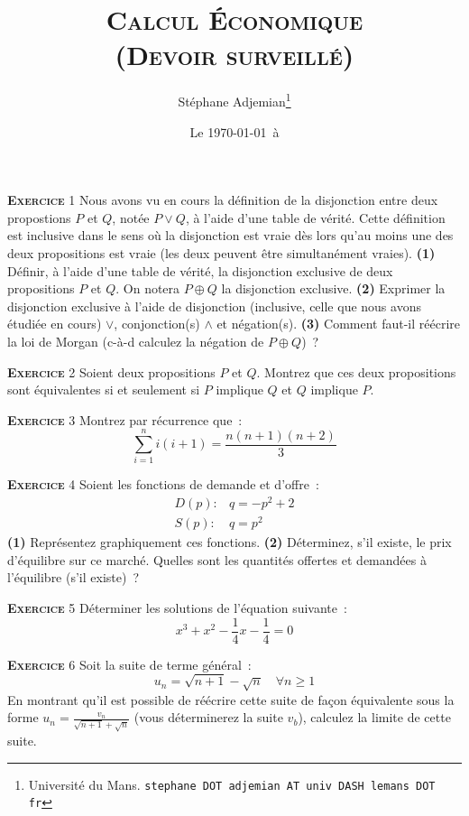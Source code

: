 \documentclass[10pt,a4paper,notitlepage]{article}
\newcommand{\exercice}[1]{\textsc{\textbf{Exercice}} #1}
\providecommand{\lxor}{\oplus}
\begin{document}
\title{\textsc{Calcul Économique\\ \small{(Devoir surveillé)}}}
\author{Stéphane Adjemian\thanks{Université du Mans. \texttt{stephane DOT adjemian AT univ DASH lemans DOT fr}}}
\date{Le \today\ à \thistime}

\maketitle

\exercice{1} Nous avons vu en cours la définition de la disjonction
entre deux propostions $P$ et $Q$, notée $P \lor Q$, à l'aide d'une
table de vérité. Cette définition est inclusive dans le sens où la
disjonction est vraie dès lors qu'au moins une des deux propositions
est vraie (les deux peuvent être simultanément vraies). \textbf{(1)}
Définir, à l'aide d'une table de vérité, la disjonction exclusive
de deux propositions $P$ et $Q$. On notera $P \lxor Q$ la
disjonction exclusive. \textbf{(2)} Exprimer la disjonction exclusive à
l'aide de disjonction (inclusive, celle que nous avons étudiée en
cours) $\lor$, conjonction(s) $\land$ et négation(s). \textbf{(3)}
Comment faut-il réécrire la loi de Morgan (c-à-d calculez la négation de
$P\lxor Q$) ?

\bigskip

\exercice{2} Soient deux propositions $P$ et $Q$. Montrez que ces deux
propositions sont équivalentes si et seulement si $P$ implique $Q$ et $Q$
implique $P$.

\bigskip

\exercice{3} Montrez par récurrence que~:
\[
  \sum_{i=1}^n i(i+1) = \frac{n(n+1)(n+2)}{3}
\]

\bigskip

\exercice{4} Soient les fonctions de demande et d'offre~:
\[
\begin{split}
  D(p):& q = -p^2+2\\
  S(p):& q = p^2
\end{split}
\] 
\textbf{(1)} Représentez graphiquement ces fonctions. \textbf{(2)} Déterminez,
s'il existe, le prix d'équilibre sur ce marché. Quelles sont les quantités
offertes et demandées à l'équilibre (s'il existe)~?

\bigskip

\exercice{5} Déterminer les solutions de l'équation suivante :
\[
x^3+x^2-\frac{1}{4}x-\frac{1}{4} = 0
\]

\exercice{6} Soit la suite de terme général :
\[
u_n = \sqrt{n+1}-\sqrt{n}\quad\forall n\geq 1
\]
En montrant qu'il est possible de réécrire cette suite de façon équivalente sous
la forme $u_n = \frac{v_n}{\sqrt{n+1}+\sqrt{n}}$ (vous déterminerez la suite
$v_b$), calculez la limite de cette suite.
\end{document}
